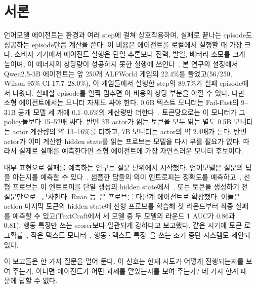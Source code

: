 \documentclass[11pt]{article}
\begin{document}
\section{서론}
언어모델 에이전트는 환경과 여러 step에 걸쳐 상호작용하며, 실패로 끝나는 episode도 성공하는 episode만큼 계산을 쓴다. 이 비용은 에이전트를 로컬에서 실행할 때 가장 크다.
소비자 기기에서 에이전트 실행은 단일 추론보다 전력, 발열, 배터리 소모를 크게 높이며, 이 에너지의 상당량이 성공하지 못한 실행에 쓰인다~\cite{pham2026agentstop}.
본 연구의 설정에서 Qwen2.5-3B 에이전트는 앞 250개 ALFWorld 게임의 22.4\%를 풀었고(56/250, Wilson 95\% CI 17.7--28.0\%), 이 게임들에서 실행한 step의 89.7\%가 실패 episode에서 나왔다.
실패할 episode를 일찍 멈추면 이 비용의 상당 부분을 아낄 수 있다. 다만 소형 에이전트에서는 모니터 자체도 싸야 한다. 0.6B 텍스트 모니터는 Fail-Fast의 9--31B 공개 모델 세 개에 0.1--0.6\%의 계산량만 더한다~\cite{wang2026failfast}.
토큰당으로는 이 모니터가 그 policy들보다 15--52배 싸다. 반면 3B actor가 읽는 토큰을 모두 읽는 별도 0.5B 모니터는 actor 계산량의 약 13--16\%를 더하고, 7B 모니터는 actor의 약 2.4배가 든다.
반면 actor가 이미 계산한 hidden state를 읽는 프로브는 모델을 다시 부를 필요가 없다. 따라서 실제로 실패를 예측한다면 소형 에이전트에 가장 자연스러운 모니터 후보이다.

내부 표현으로 실패를 예측하는 연구는 질문 단위에서 시작했다. 언어모델은 질문의 답을 아는지를 예측할 수 있다~\cite{kadavath2022know}. 샘플한 답들의 의미 엔트로피는 정확도를 예측하고~\cite{kuhn2023semantic},
선형 프로브는 이 엔트로피를 단일 생성의 hidden state에서~\cite{kossen2024sep}, 또는 토큰을 생성하기 전 질문만으로~\cite{moreno2026noanswer} 근사한다. Ruan 등~\cite{ruan2026doomed}은 프로브를 다단계 에이전트로 확장했다.
이들은 action 마지막 토큰의 hidden state에 선형 프로브를 학습해 첫 라운드부터 최종 실패를 예측할 수 있고(TextCraft에서 세 모델 중 두 모델의 라운드 1 AUC가 0.86과 0.81),
행동 특징만 쓰는 scorer보다 일관되게 강하다고 보고했다. 같은 시기에 토큰 로그확률~\cite{pham2026agentstop}, 작은 텍스트 모니터~\cite{wang2026failfast}, 행동·텍스트 특징~\cite{shi2026earlyeval}을 쓰는 조기 중단 시스템도 제안되었다.

이 보고들은 한 가지 질문을 열어 둔다. 이 신호는 현재 시도가 어떻게 진행되는지를 보여 주는가, 아니면 에이전트가 어떤 과제를 맡았는지를 보여 주는가? 네 가지 한계 때문에 답할 수 없다.
\end{document}
